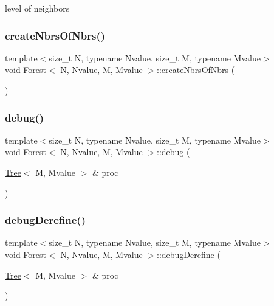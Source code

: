 level of neighbors \mbox{\label{classForest_ac27f3fb712096592183fd7abf331bfbd}} 
\subsubsection{\texorpdfstring{create\+Nbrs\+Of\+Nbrs()}{createNbrsOfNbrs()}}
{\footnotesize\ttfamily template$<$size\+\_\+t N, typename Nvalue, size\+\_\+t M, typename Mvalue$>$ \\
void \mbox{\hyperlink{classForest}{Forest}}$<$ N, Nvalue, M, Mvalue $>$\+::create\+Nbrs\+Of\+Nbrs (\begin{DoxyParamCaption}{ }\end{DoxyParamCaption})}

\mbox{\label{classForest_ac13e32c23aef11227af7242727db8222}} 
\subsubsection{\texorpdfstring{debug()}{debug()}}
{\footnotesize\ttfamily template$<$size\+\_\+t N, typename Nvalue, size\+\_\+t M, typename Mvalue$>$ \\
void \mbox{\hyperlink{classForest}{Forest}}$<$ N, Nvalue, M, Mvalue $>$\+::debug (\begin{DoxyParamCaption}\item[{\mbox{\hyperlink{classTree}{Tree}}$<$ M, Mvalue $>$ \&}]{proc }\end{DoxyParamCaption})}

\mbox{\label{classForest_a39d07ba859ced552613ddc78e690d197}} 
\subsubsection{\texorpdfstring{debug\+Derefine()}{debugDerefine()}}
{\footnotesize\ttfamily template$<$size\+\_\+t N, typename Nvalue, size\+\_\+t M, typename Mvalue$>$ \\
void \mbox{\hyperlink{classForest}{Forest}}$<$ N, Nvalue, M, Mvalue $>$\+::debug\+Derefine (\begin{DoxyParamCaption}\item[{\mbox{\hyperlink{classTree}{Tree}}$<$ M, Mvalue $>$ \&}]{proc }\end{DoxyParamCaption})}

